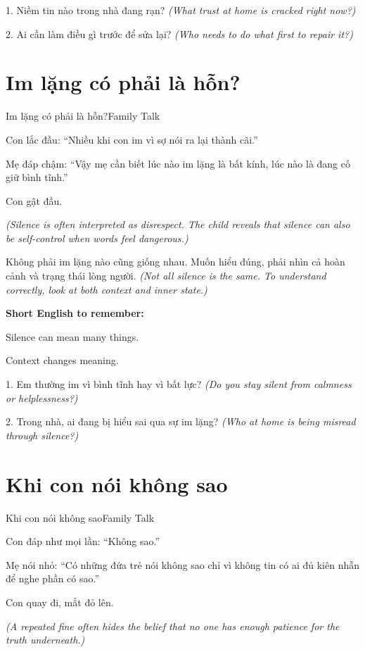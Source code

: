 \begin{tuhocnhanh}
1. Niềm tin nào trong nhà đang rạn? \textit{(What trust at home is cracked right now?)}

2. Ai cần làm điều gì trước để sửa lại? \textit{(Who needs to do what first to repair it?)}
\end{tuhocnhanh}
\ngancach

\section{Im lặng có phải là hỗn?}
\begin{truyen}{Im lặng có phải là hỗn?}{Family Talk}

Con lắc đầu: ``Nhiều khi con im vì sợ nói ra lại thành cãi.''

Mẹ đáp chậm: ``Vậy mẹ cần biết lúc nào im lặng là bất kính, lúc nào là đang cố giữ bình tĩnh.''

Con gật đầu.

\textit{(Silence is often interpreted as disrespect. The child reveals that silence can also be self-control when words feel dangerous.)}
\end{truyen}

\begin{baihoc}
Không phải im lặng nào cũng giống nhau. Muốn hiểu đúng, phải nhìn cả hoàn cảnh và trạng thái lòng người.
\textit{(Not all silence is the same. To understand correctly, look at both context and inner state.)}
\end{baihoc}

\begin{ghinhoanh}
\textbf{Short English to remember:}

Silence can mean many things.

Context changes meaning.
\end{ghinhoanh}

\begin{tuhocnhanh}
1. Em thường im vì bình tĩnh hay vì bất lực? \textit{(Do you stay silent from calmness or helplessness?)}

2. Trong nhà, ai đang bị hiểu sai qua sự im lặng? \textit{(Who at home is being misread through silence?)}
\end{tuhocnhanh}
\ngancach

\section{Khi con nói không sao}
\begin{truyen}{Khi con nói không sao}{Family Talk}

Con đáp như mọi lần: ``Không sao.''

Mẹ nói nhỏ: ``Có những đứa trẻ nói không sao chỉ vì không tin có ai đủ kiên nhẫn để nghe phần có sao.''

Con quay đi, mắt đỏ lên.

\textit{(A repeated fine often hides the belief that no one has enough patience for the truth underneath.)}
\end{truyen}


